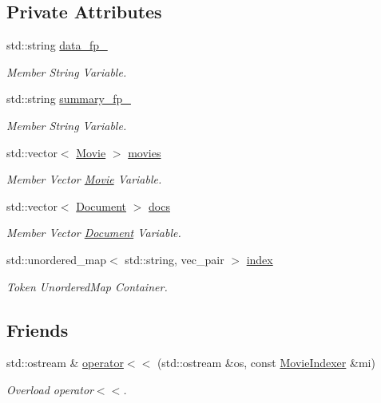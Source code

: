 \subsection*{Private Attributes}
\begin{DoxyCompactItemize}
\item 
std\+::string \hyperlink{class_movie_indexer_ae7694a6ed8890793145c43a6d66817b3}{data\+\_\+fp\+\_\+}
\begin{DoxyCompactList}\small\item\em Member String Variable. \end{DoxyCompactList}\item 
std\+::string \hyperlink{class_movie_indexer_a0d98a6556c32ebe752e886f7c73ef790}{summary\+\_\+fp\+\_\+}
\begin{DoxyCompactList}\small\item\em Member String Variable. \end{DoxyCompactList}\item 
std\+::vector$<$ \hyperlink{class_movie}{Movie} $>$ \hyperlink{class_movie_indexer_aabec6af7722fa0f54eb9153bef799db7}{movies}
\begin{DoxyCompactList}\small\item\em Member Vector \hyperlink{class_movie}{Movie} Variable. \end{DoxyCompactList}\item 
std\+::vector$<$ \hyperlink{class_document}{Document} $>$ \hyperlink{class_movie_indexer_ae931ceafb1dac1d376c85d37d89a1e8f}{docs}
\begin{DoxyCompactList}\small\item\em Member Vector \hyperlink{class_document}{Document} Variable. \end{DoxyCompactList}\item 
std\+::unordered\+\_\+map$<$ std\+::string, vec\+\_\+pair $>$ \hyperlink{class_movie_indexer_a65c1c95748e5aabd897f13addd1de8a1}{index}
\begin{DoxyCompactList}\small\item\em Token Unordered\+Map Container. \end{DoxyCompactList}\end{DoxyCompactItemize}
\subsection*{Friends}
\begin{DoxyCompactItemize}
\item 
std\+::ostream \& \hyperlink{class_movie_indexer_ac341c6cedb7cda66713cf4bdd0fb8d72}{operator$<$$<$} (std\+::ostream \&os, const \hyperlink{class_movie_indexer}{Movie\+Indexer} \&mi)
\begin{DoxyCompactList}\small\item\em Overload operator$<$$<$. \end{DoxyCompactList}\end{DoxyCompactItemize}
